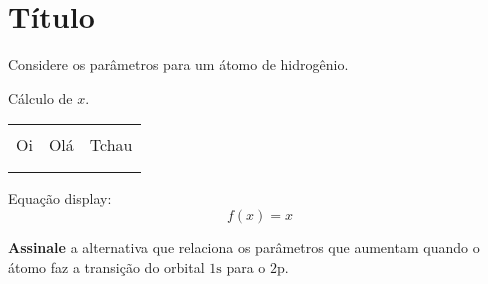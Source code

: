 \section{Título}

Considere os parâmetros para um átomo de hidrogênio.

\begin{example}

Cálculo de \(x\).


\end{example}

\begin{tabular}{lrc}

\toprule\\
Oi & Olá & Tchau\\
\midrule\\
\bottomrule\\
\end{tabular}

Equação display: \[
    f(x) = x
\]

\textbf{Assinale} a alternativa que relaciona os parâmetros que aumentam
quando o átomo faz a transição do orbital \(\mathrm{1s}\) para o
\(\mathrm{2p}\).